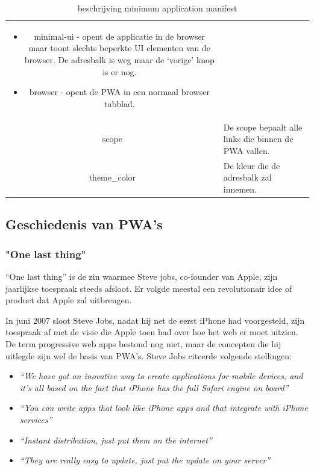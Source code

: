 \begin{table}[H]
\begin{tabular}{cp{12cm}}
\begin{itemize}
			     		  \item minimal-ui - opent de applicatie in de browser maar toont slechts beperkte UI elementen van de browser. De adresbalk is weg maar de ‘vorige’ knop is er nog.
			     		  \item browser - opent de PWA in een normaal browser tabblad.
		     		\end{itemize} \\
	     		scope & De scope bepaalt alle links die binnen de PWA vallen. \\
	     		theme\_color & De kleur die de adresbalk zal innemen.
			\end{tabular}	
			\caption{beschrijving minimum application manifest}
			\label{tabelManifest}
		\end{table}
				
			
	
	
	\autocite{LePage2020}

\subsection{Geschiedenis van PWA's}

	\subsubsection{"One last thing"}

		 “One last thing” is de zin waarmee Steve jobs, co-founder van Apple, zijn jaarlijkse toespraak steeds afsloot. Er volgde meestal een revolutionair idee of product dat Apple zal uitbrengen.
		
		In juni 2007 sloot Steve Jobs, nadat hij net de eerst iPhone had voorgesteld, zijn toespraak af met de visie die Apple toen had over hoe het web er moet uitzien. De term progressive web apps bestond nog niet, maar de concepten die hij uitlegde zijn wel de basis van PWA's. Steve Jobs citeerde volgende stellingen:
	
		
		\begin{itemize}
			\item \textit{ “We have got an inovative way to create applications for mobile devices, and it’s all based on the fact that iPhone has the full Safari engine on board”}
			\item \textit{“You can write apps that look like iPhone apps and that integrate with iPhone services”}
			\item \textit{“Instant distribution, just put them on the internet”}
			\item \textit{“They are really easy to update, just put the update on your server”}
		\end{itemize}
		\autocite{Jobs2007}
		
